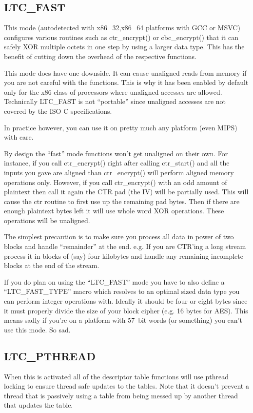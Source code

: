 \documentclass[a4paper]{book}
\begin{document}
\subsection{LTC\_FAST}
This mode (autodetected with x86\_32,x86\_64 platforms with GCC or MSVC) configures various routines such as ctr\_encrypt() or 
cbc\_encrypt() that it can safely XOR multiple octets in one step by using a larger data type.  This has the benefit of 
cutting down the overhead of the respective functions.  

This mode does have one downside.  It can cause unaligned reads from memory if you are not careful with the functions.  This is why
it has been enabled by default only for the x86 class of processors where unaligned accesses are allowed.  Technically LTC\_FAST
is not ``portable'' since unaligned accesses are not covered by the ISO C specifications.

In practice however, you can use it on pretty much any platform (even MIPS) with care.

By design the ``fast'' mode functions won't get unaligned on their own.  For instance, if you call ctr\_encrypt() right after calling
ctr\_start() and all the inputs you gave are aligned than ctr\_encrypt() will perform aligned memory operations only.  However, if you 
call ctr\_encrypt() with an odd amount of plaintext then call it again the CTR pad (the IV) will be partially used.  This will
cause the ctr routine to first use up the remaining pad bytes.  Then if there are enough plaintext bytes left it will use 
whole word XOR operations.  These operations will be unaligned.

The simplest precaution is to make sure you process all data in power of two blocks and handle ``remainder'' at the end.  e.g. If you are 
CTR'ing a long stream process it in blocks of (say) four kilobytes and handle any remaining incomplete blocks at the end of the stream.  

If you do plan on using the ``LTC\_FAST'' mode you have to also define a ``LTC\_FAST\_TYPE'' macro which resolves to an optimal sized
data type you can perform integer operations with.  Ideally it should be four or eight bytes since it must properly divide the size 
of your block cipher (e.g. 16 bytes for AES).  This means sadly if you're on a platform with 57--bit words (or something) you can't 
use this mode.  So sad.

\subsection{LTC\_PTHREAD}
When this is activated all of the descriptor table functions will use pthread locking to ensure thread safe updates to the tables.  Note that 
it doesn't prevent a thread that is passively using a table from being messed up by another thread that updates the table.
\end{document}
